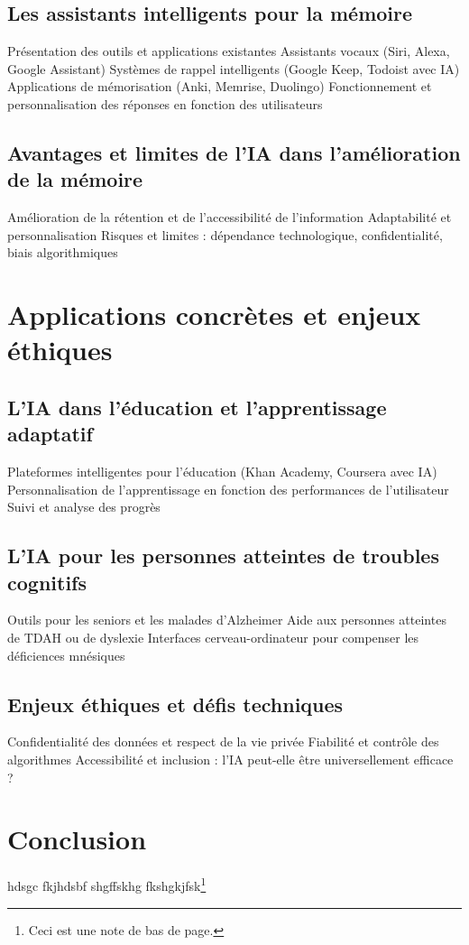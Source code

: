 \documentclass[12pt,a4paper]{report}
\begin{document}
\section{Les assistants intelligents pour la mémoire}
Présentation des outils et applications existantes
Assistants vocaux (Siri, Alexa, Google Assistant)
Systèmes de rappel intelligents (Google Keep, Todoist avec IA)
Applications de mémorisation (Anki, Memrise, Duolingo)
Fonctionnement et personnalisation des réponses en fonction des utilisateurs
\section{Avantages et limites de l'IA dans l'amélioration de la mémoire}
Amélioration de la rétention et de l'accessibilité de l'information
Adaptabilité et personnalisation
Risques et limites : dépendance technologique, confidentialité, biais algorithmiques
\chapter{Applications concrètes et enjeux éthiques}
\section{L'IA dans l'éducation et l'apprentissage adaptatif}
Plateformes intelligentes pour l'éducation (Khan Academy, Coursera avec IA)
Personnalisation de l'apprentissage en fonction des performances de l'utilisateur
Suivi et analyse des progrès
\section{L'IA pour les personnes atteintes de troubles cognitifs}
Outils pour les seniors et les malades d'Alzheimer
Aide aux personnes atteintes de TDAH ou de dyslexie
Interfaces cerveau-ordinateur pour compenser les déficiences mnésiques
\section{Enjeux éthiques et défis techniques}
Confidentialité des données et respect de la vie privée
Fiabilité et contrôle des algorithmes
Accessibilité et inclusion : l'IA peut-elle être universellement efficace ?

\chapter*{Conclusion}
hdsgc fkjhdsbf shgffskhg fkshgkjfsk\footnote{Ceci est une note de bas de page.}
\end{document}
